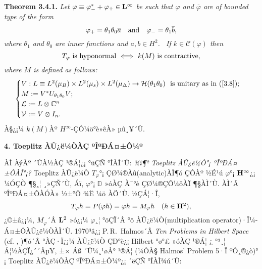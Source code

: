 \documentclass[12pt,a4paper,2sided]{article}
\begin{document}
\newpage{} \vspace{0.8cm}

{\bf Theorem 3.4.1.} {\rm \cite{CHL1}} {\sl Let $\varphi\equiv
\varphi_-^*+\varphi_+\in \bold L^\infty$ be such that $\varphi$
and $\overline\varphi$ are of bounded type of the form
$$
\varphi_+=\theta_1\theta_0\overline a\quad\hbox{and}\quad
\varphi_-=\theta_1\overline b,
$$
where $\theta_1$ and $\theta_0$ are inner functions and $a,b\in
H^2$. \  If $k\in\mathcal{C}(\varphi)$ then
$$
T_\varphi\ \hbox{is hyponormal}\ \Longleftrightarrow\ k(M)\ \hbox{is
contractive},
$$
where $M$ is defined as follows:
\begin{equation}\label{3.10}
\begin{cases}
V: L\equiv L^2(\mu_B) \times L^2(\mu_s)
         \times L^2(\mu_{\Delta})\to \mathcal H(\theta_1 \theta_0)\ \
            \hbox{\rm is unitary as in (\ref{3.8})};\\
M:= V^*U_{\theta_1\theta_0}V;\\
\mathcal L :=L \otimes \mathbb C^n\\
\mathcal V := V \otimes I_n.
\end{cases}
\end{equation}}
À§¿¡¼­ $k(M)$Àº $H^\infty$-ÇÔ¼ö°è»êÀ» µû¸¥´Ù.



\vspace{.8 cm} {\large\bf 4. Toeplitz ÀÛ¿ë¼ÒÀÇ ºÎºÐÁ¤±Ô¼º}

\vspace{.5 cm}


ÀÌ ÀýÀº ´ÙÀ½ÀÇ ¹®Á¦¿¡ °üÇÑ °ÍÀÌ´Ù: {\it ¾î¶² Toeplitz ÀÛ¿ë¼Ò°¡
ºÎºÐÁ¤±ÔÀÎ°¡?} Toeplitz ÀÛ¿ë¼Ò $T_\varphi$°¡ ÇØ¼®Àû(analytic)ÀÌ¶ó
ÇÔÀº ½É¹ú $\varphi$°¡ $\bold H^\infty$¿¡ ¼ÓÇÒ ¶§¸¦ ¸»ÇÑ´Ù, Áï,
$\varphi$°¡ $\mathbb{D}$ »óÀÇ À¯°è ÇØ¼®ÇÔ¼öÀÏ ¶§ÀÌ´Ù. ÀÌ´Â
ºÎºÐÁ¤±ÔÀÓÀ» ½±°Ô ¾Ë ¼ö ÀÖ´Ù. ½ÇÁ¦·Î,
$$
T_\varphi h=P(\varphi h)=\varphi h=M_\varphi h\quad \hbox{($h\in \bold H^2$)},
$$
¿©±â¿¡¼­, $M_\varphi$´Â   $\bold L^2$ »ó¿¡¼­ $\varphi$¸¦ °öÇÏ´Â °ö
ÀÛ¿ë¼Ò(multiplication operator)·Î¼­ Á¤±ÔÀÛ¿ë¼ÒÀÌ´Ù. 1970³â¿¡
P.\,R.\ Halmos´Â {\it Ten Problems in Hilbert Space} (cf.
\cite{Ha1}, \cite{Ha2})¶ó´Â °­ÀÇ·Ï¿¡¼­ ÀÛ¿ë¼Ò ÇÐ°è¿¡  Hilbert °ø°£
»óÀÇ ¹®Á¦ ¿­ °³¸¦ Á¦½ÃÇÏ¿´´Âµ¥, ±× Áß ´Ù¼¸¹øÂ° ¹®Á¦ (¼ÒÀ§ Halmos'
Problem 5·Î ºÒ¸®¿ò)°¡ Toeplitz ÀÛ¿ë¼ÒÀÇ ºÎºÐÁ¤±Ô¼º¿¡ ´ëÇÑ
°ÍÀÌ¾ú´Ù:
\end{document}
